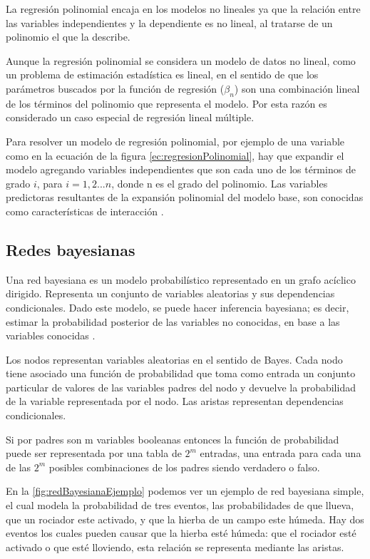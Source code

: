 La regresión polinomial encaja en los modelos no lineales ya que la relación entre las variables independientes y la dependiente es no lineal, al tratarse de un polinomio el que la describe.

Aunque la regresión polinomial se considera un modelo de datos no lineal, como un problema de estimación estadística es lineal, en el sentido de que los parámetros buscados por la función de regresión ($\beta_n$) son una combinación lineal de los términos del polinomio que representa el modelo. Por esta razón es considerado un caso especial de regresión lineal múltiple.

Para resolver un modelo de regresión polinomial, por ejemplo de una variable como en la ecuación de la figura \ref{ec:regresionPolinomial}, hay que expandir el modelo agregando variables independientes que son cada uno de los términos de grado $i$, para $i=1,2... n$, donde n es el grado del polinomio.
Las variables predictoras resultantes de la expansión polinomial del modelo base, son conocidas como características de interacción \cite{YWChangCJHsiehKWChangTrainingAndTesting}.

\subsection{Redes bayesianas}
Una red bayesiana es un modelo probabilístico representado en un grafo acíclico dirigido. Representa un conjunto de variables aleatorias y sus dependencias condicionales. Dado este modelo, se puede hacer inferencia bayesiana; es decir, estimar la probabilidad posterior de las variables no conocidas, en base a las variables conocidas \cite{LESucarChapter1RedesBayesianas}.

Los nodos representan variables aleatorias en el sentido de Bayes. Cada nodo tiene asociado una función de probabilidad que toma como entrada un conjunto particular de valores de las variables padres del nodo y devuelve la probabilidad de la variable representada por el nodo. Las aristas representan dependencias condicionales.

Si por padres son m variables booleanas entonces la función de probabilidad puede ser representada por una tabla de $2^m$ entradas, una entrada para cada una de las $2^m$ posibles combinaciones de los padres siendo verdadero o falso.

En la \ref{fig:redBayesianaEjemplo} podemos ver un ejemplo de red bayesiana simple, el cual modela la probabilidad de tres eventos, las probabilidades de que llueva, que un rociador este activado, y que la hierba de un campo este húmeda. Hay dos eventos los cuales pueden causar que la hierba esté húmeda: que el rociador esté activado o que esté lloviendo, esta relación se representa mediante las aristas.

